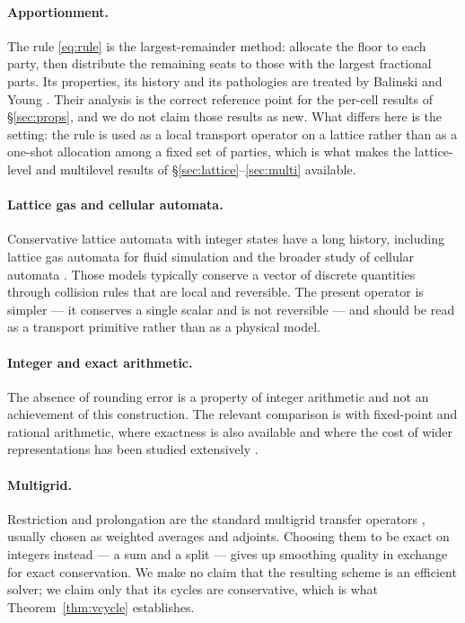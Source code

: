 \documentclass[11pt,a4paper]{article}
\theoremstyle{definition}
\begin{document}
\paragraph{Apportionment.} The rule \eqref{eq:rule} is the largest-remainder
method: allocate the floor to each party, then distribute the remaining seats
to those with the largest fractional parts. Its properties, its history and its
pathologies are treated by Balinski and Young \cite{balinski1982}. Their
analysis is the correct reference point for the per-cell results of
\S\ref{sec:props}, and we do not claim those results as new. What differs here
is the setting: the rule is used as a local transport operator on a lattice
rather than as a one-shot allocation among a fixed set of parties, which is
what makes the lattice-level and multilevel results of
\S\ref{sec:lattice}--\ref{sec:multi} available.

\paragraph{Lattice gas and cellular automata.} Conservative lattice automata
with integer states have a long history, including lattice gas automata for
fluid simulation \cite{frisch1986} and the broader study of cellular automata
\cite{wolfram2002}. Those models typically conserve a vector of discrete
quantities through collision rules that are local and reversible. The present
operator is simpler --- it conserves a single scalar and is not reversible ---
and should be read as a transport primitive rather than as a physical model.

\paragraph{Integer and exact arithmetic.} The absence of rounding error is a
property of integer arithmetic and not an achievement of this construction. The
relevant comparison is with fixed-point and rational arithmetic, where exactness
is also available and where the cost of wider representations has been studied
extensively \cite{yates2013}.

\paragraph{Multigrid.} Restriction and prolongation are the standard multigrid
transfer operators \cite{briggs2000}, usually chosen as weighted averages and
adjoints. Choosing them to be exact on integers instead --- a sum and a split
--- gives up smoothing quality in exchange for exact conservation. We make no
claim that the resulting scheme is an efficient solver; we claim only that its
cycles are conservative, which is what Theorem~\ref{thm:vcycle} establishes.
\end{document}
